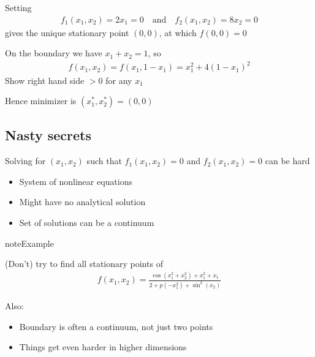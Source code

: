 \documentclass[letterpaper,10pt,english]{jupyterBook}
\begin{document}
\sphinxAtStartPar
Setting
\begin{equation*}
\begin{split}
f_1(x_1, x_2) = 2 x_1 = 0 
\quad \text{and} \quad
f_2(x_1, x_2) = 8 x_2 = 0 
\end{split}
\end{equation*}
\sphinxAtStartPar
gives the unique stationary point \((0, 0)\), at which \(f(0, 0) = 0\)

\sphinxAtStartPar
On the boundary we have \(x_1 + x_2 = 1\), so
\begin{equation*}
\begin{split}
f(x_1, x_2) 
= f(x_1, 1 - x_1) 
= x_1^2 + 4 (1 - x_1)^2
\end{split}
\end{equation*}
\sphinxAtStartPar
{} Show right hand side \(> 0\) for any \(x_1\)

\sphinxAtStartPar
Hence minimizer is \((x_1^*, x_2^*) = (0, 0)\)


\subsection{Nasty secrets}
\label{\detokenize{02.optimization_intro:nasty-secrets}}
\sphinxAtStartPar
Solving for \((x_1, x_2)\) such that \(f_1(x_1, x_2) = 0\) and \(f_2(x_1, x_2) = 0\) can be hard
\begin{itemize}
\item {} 
\sphinxAtStartPar
System of nonlinear equations

\item {} 
\sphinxAtStartPar
Might have no analytical solution

\item {} 
\sphinxAtStartPar
Set of solutions can be a continuum

\end{itemize}

\begin{sphinxadmonition}{note}{Example}

\sphinxAtStartPar
(Don’t) try to find all stationary  points of
\begin{equation*}
\begin{split}
f(x_1, x_2) = \frac{\cos(x_1^2 + x_2^2) + x_1^2 + x_1}{2 +
p(-x_1^2) + \sin^2(x_2)}
\end{split}
\end{equation*}\end{sphinxadmonition}

\sphinxAtStartPar
Also:
\begin{itemize}
\item {} 
\sphinxAtStartPar
Boundary is often a continuum, not just two points

\item {} 
\sphinxAtStartPar
Things get even harder in higher dimensions

\end{itemize}
\end{document}
